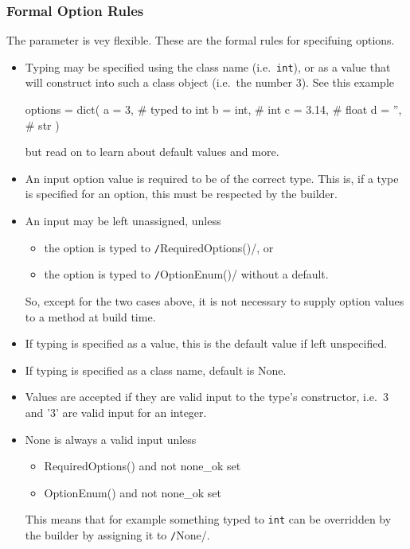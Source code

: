 \subsubsection{Formal Option Rules}
The \options parameter is vey flexible.  These are the formal rules
for specifuing options.
\begin{itemize}

\item Typing may be specified using the class name (i.e.\ \texttt{int}), or as
  a value that will construct into such a class object (i.e.\ the
  number 3).  See this example
  \begin{python}
options = dict(
    a = 3,     # typed to int
    b = int,   #          int
    c = 3.14,  #          float
    d = '',    #          str
)
  \end{python}
  but read on to learn about default values and more.

 \item An input option value is required to be of the correct type.  This is,
  if a type is specified for an option, this must be respected by the
  builder.

\item An input may be left unassigned, unless
  \begin{itemize}
  \item the option is typed to \texttt/RequiredOptions()/, or
  \item the option is typed to \texttt/OptionEnum()/ without a default.
  \end{itemize}
  So, except for the two cases above, it is not necessary to supply
  option values to a method at build time.

\item If typing is specified as a value, this is the default value if
  left unspecified.

\item If typing is specified as a class name, default is None.

\item Values are accepted if they are valid input to the type's
  constructor, i.e.\ 3 and '3' are valid input for an integer.

\item None is always a valid input unless
  \begin{itemize}
  \item RequiredOptions() and not none\_ok set
  \item OptionEnum() and not none\_ok set
  \end{itemize}
  This means that for example something typed to \texttt{int} can be
  overridden by the builder by assigning it to
  \texttt/None/.


\end{itemize}
